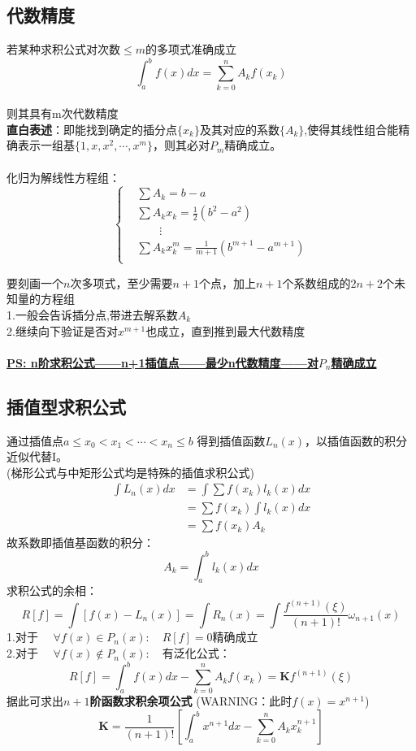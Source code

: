 \documentclass[12pt]{article}
\begin{document}
\begin{CJK*}{UTF8}{gbsn}
\begin{spacing}{1.5}
\subsection{代数精度}
    若某种求积公式对次数$\leq m$的多项式准确成立 \\
    $$\int_a^b f(x)dx = \sum_{k=0}^{n}A_kf(x_k)$$  \\
    则其具有m次代数精度\\
    \textbf{直白表述}：即能找到确定的插分点$\{x_k\}$及其对应的系数$\{A_k\}$,使得其线性组合能精确表示一组基$\{1,x,x^2,\cdots,x^m\}$，则其必对$P_m$精确成立。\\ 
    \\
    化归为解线性方程组：\\
    $$
    \left \{
    \begin{aligned}
        &\sum A_k = b-a\\
        &\sum A_k x_k = \frac{1}{2}(b^2-a^2)\\
        &\qquad    \vdots \\
        &\sum A_k x^m_k = \frac{1}{m+1}(b^{m+1}-a^{m+1})\\
    \end{aligned}
    \right.
    $$
    
    要刻画一个$n$次多项式，至少需要$n+1$个点，加上$n+1$个系数组成的$2n+2$个未知量的方程组\\
    1.一般会告诉插分点,带进去解系数$A_k$\\
    2.继续向下验证是否对$x^{m+1}$也成立，直到推到最大代数精度\\\\
    \textbf{\underline{PS: n阶求积公式——n+1插值点——最少n代数精度——对$P_n$精确成立}}

\newpage
\subsection{插值型求积公式}
    通过插值点$a\leq x_0 < x_1 < \cdots < x_n \leq b$ 得到插值函数$L_n(x)$，以插值函数的积分近似代替I。\\
    (梯形公式与中矩形公式均是特殊的插值求积公式)\\
    $$
    \begin{aligned}
        \int L_n(x)dx &= \int \sum f(x_k)l_k(x)dx  \\
                      &= \sum f(x_k) \int l_k(x)dx \\
                      &= \sum  f(x_k)A_k
    \end{aligned}
    $$
    故系数即插值基函数的积分：
    $$A_k = \int_a^bl_k(x)dx $$
    求积公式的余相：
    $$R[f] = \int[f(x) - L_n(x)] = \int R_n(x)
            = \int \frac{f^{(n+1)}(\xi)}{(n+1)!}\omega_{n+1}(x)
    $$
    1.对于 $\quad \forall f(x) \in P_n(x): \quad  R[f] = 0$精确成立\\
    2.对于 $\quad \forall f(x) \notin P_n(x):\quad$有泛化公式：
    $$
        R[f] = \int_a^b f(x)dx - \sum_{k=0}^n A_k f(x_k) = \boldsymbol{K}f^{(n+1)}(\xi)
    $$
    据此可求出\textbf{$n+1$阶函数求积余项公式} (WARNING：此时$f(x) = x^{n+1}$)\\
    $$    \boldsymbol{K} = \frac{1}{(n+1)!}[\int_a^b x^{n+1}dx - \sum_{k=0}^n A_k x_k^{n+1}]
    $$
\newpage

\end{spacing}
\end{CJK*}
\end{document}
